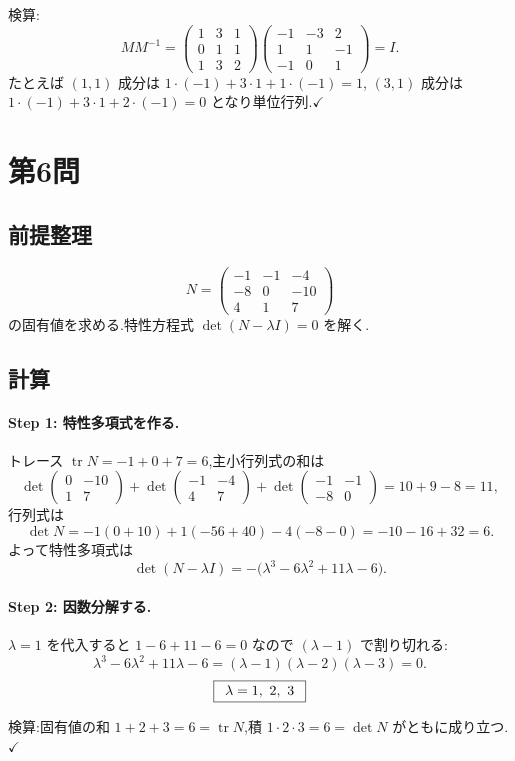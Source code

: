 \documentclass[11pt,a4paper]{article}
\begin{document}
検算:
\[
M M^{-1}=\begin{pmatrix}1&3&1\\0&1&1\\1&3&2\end{pmatrix}
\begin{pmatrix}-1&-3&2\\1&1&-1\\-1&0&1\end{pmatrix}=I.
\]
たとえば $(1,1)$ 成分は $1\cdot(-1)+3\cdot1+1\cdot(-1)=1$,
$(3,1)$ 成分は $1\cdot(-1)+3\cdot1+2\cdot(-1)=0$ となり単位行列.$\checkmark$

\section*{第6問}

\subsection*{前提整理}

\[
N=\begin{pmatrix}-1&-1&-4\\-8&0&-10\\4&1&7\end{pmatrix}
\]
の固有値を求める.特性方程式 $\det(N-\lambda I)=0$ を解く.

\subsection*{計算}

\paragraph{Step 1: 特性多項式を作る.}
トレース $\operatorname{tr}N=-1+0+7=6$,主小行列式の和は
\[
\det\!\begin{pmatrix}0&-10\\1&7\end{pmatrix}
+\det\!\begin{pmatrix}-1&-4\\4&7\end{pmatrix}
+\det\!\begin{pmatrix}-1&-1\\-8&0\end{pmatrix}
=10+9-8=11,
\]
行列式は
\[
\det N=-1(0+10)+1(-56+40)-4(-8-0)=-10-16+32=6.
\]
よって特性多項式は
\[
\det(N-\lambda I)=-\bigl(\lambda^3-6\lambda^2+11\lambda-6\bigr).
\]

\paragraph{Step 2: 因数分解する.}
$\lambda=1$ を代入すると $1-6+11-6=0$ なので $(\lambda-1)$ で割り切れる:
\[
\lambda^3-6\lambda^2+11\lambda-6=(\lambda-1)(\lambda-2)(\lambda-3)=0.
\]
\[
\boxed{\,\
\lambda=1,\ 2,\ 3\ \,}
\]

検算:固有値の和 $1+2+3=6=\operatorname{tr}N$,積 $1\cdot2\cdot3=6=\det N$ がともに成り立つ.$\checkmark$
\end{document}
